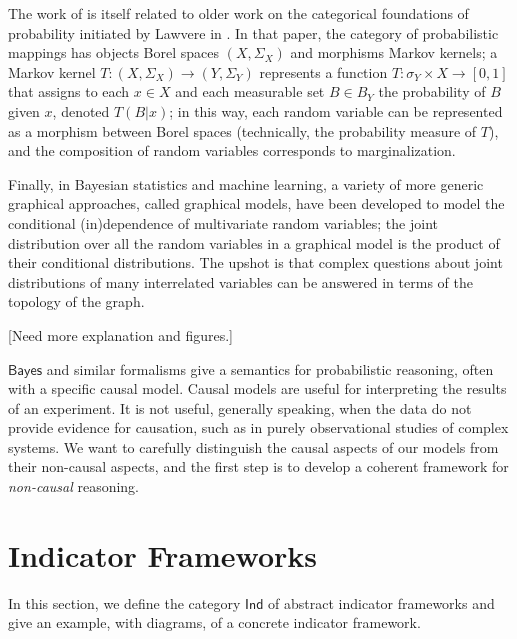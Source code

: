 \documentclass{sig-alternate-05-2015}
\theoremstyle{plain}
\theoremstyle{plain}
\theoremstyle{remark}
\newcommand{\redout}[1]{{\color{red}#1}}
\newcommand{\Cat}[1]{\mathsf{#1}}
\def\Ind{\Cat{Ind}}
\def\Bayes{\Cat{Bayes}}
\begin{document}
The work of \cite{coecke_spekkens} is itself related to older work on the categorical foundations of probability initiated by Lawvere in \cite{lawvere62}. In that paper, the category of probabilistic mappings has objects Borel spaces $(X, \Sigma_X)$ and morphisms Markov kernels; a Markov kernel $T : (X, \Sigma_X) \to (Y, \Sigma_Y)$ represents a function $T : \sigma_Y \times X \to [0,1]$ that assigns to each $x \in X$ and each measurable set $B \in B_Y$ the probability of $B$ given $x$, denoted $T(B | x)$; in this way, each random variable can be represented as a morphism between Borel spaces (technically, the probability measure of $T$), and the composition of random variables corresponds to marginalization. %

\redout{Finally, in Bayesian statistics and machine learning, a variety of more generic graphical approaches, called graphical models, have been developed to model the conditional (in)dependence of multivariate random variables; the joint distribution over all the random variables in a graphical model is the product of their conditional distributions. The upshot is that complex questions about joint distributions of many interrelated variables can be answered in terms of the topology of the graph. 

[Need more explanation and figures.]}

$\Bayes$ and similar formalisms give a semantics for probabilistic reasoning, often with a specific causal model. Causal models are useful for interpreting the results of an experiment. It is not useful, generally speaking, when the data do not provide evidence for causation, such as in purely observational studies of complex systems. We want to carefully distinguish the causal aspects of our models from their non-causal aspects, and the first step is to develop a coherent framework for \emph{non-causal} reasoning. %


\section{Indicator Frameworks}
In this section, we define the category $\Ind$ of abstract indicator frameworks and give an example, with diagrams, of a concrete indicator framework.
\end{document}
